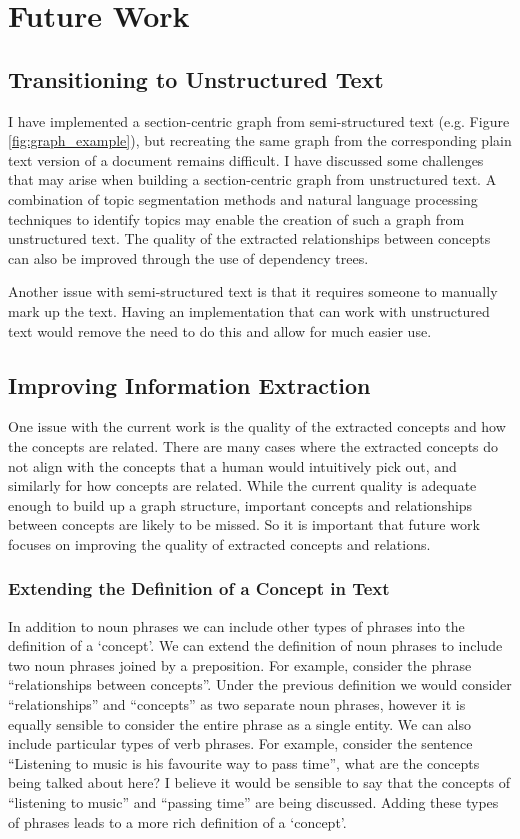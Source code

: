 \documentclass[12pt]{article}
\begin{document}
\section{Future Work} \label{sec:future_work}
\subsection{Transitioning to Unstructured Text}
I have implemented a section-centric graph from semi-structured text (e.g. Figure \ref{fig:graph_example}), but recreating the same graph from the corresponding plain text version of a document remains difficult. I have discussed some challenges that may arise when building a section-centric graph from unstructured text. A combination of topic segmentation methods and natural language processing techniques to identify topics may enable the creation of such a graph from unstructured text. The quality of the extracted relationships between concepts can also be improved through the use of dependency trees.

Another issue with semi-structured text is that it requires someone to manually mark up the text. Having an implementation that can work with unstructured text would remove the need to do this and allow for much easier use.

\subsection{Improving Information Extraction}
One issue with the current work is the quality of the extracted concepts and how the concepts are related. There are many cases where the extracted concepts do not align with the concepts that a human would intuitively pick out, and similarly for how concepts are related. While the current quality is adequate enough to build up a graph structure, important concepts and relationships between concepts are likely to be missed. So it is important that future work focuses on improving the quality of extracted concepts and relations.

\subsubsection{Extending the Definition of a Concept in Text}
In addition to noun phrases we can include other types of phrases into the definition of a `concept'. We can extend the definition of noun phrases to include two noun phrases joined by a preposition. For example, consider the phrase ``relationships between concepts''. Under the previous definition we would consider ``relationships'' and ``concepts'' as two separate noun phrases, however it is equally sensible to consider the entire phrase as a single entity. We can also include particular types of verb phrases. For example, consider the sentence ``Listening to music is his favourite way to pass time'', what are the concepts being talked about here? I believe it would be sensible to say that the concepts of ``listening to music'' and ``passing time'' are being discussed. Adding these types of phrases leads to a more rich definition of a `concept'. 
\end{document}
